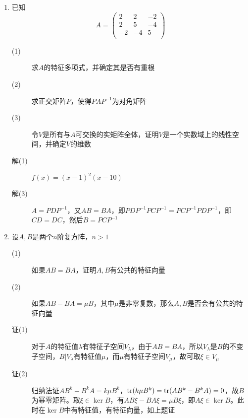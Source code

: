 \begin{enumerate}
\item 已知
\[
A = \left(
\begin{array}{ccc}
2 & 2 & -2 \\
2 & 5 & -4 \\
-2 & -4 & 5 \\
\end{array}\right)
\]
\begin{description}
\item[(1)] 求$A$的特征多项式，并确定其是否有重根
\item[(2)] 求正交矩阵$P$，使得$PAP^{-1}$为对角矩阵
\item[(3)] 令$V$是所有与$A$可交换的实矩阵全体，证明$V$是一个实数域上的线性空间，并确定$V$的维数
\item[解(1)] $f(x)=(x-1)^2(x-10)$
\item[解(3)] $A=PDP^{-1}$，又$AB=BA$，即$PDP^{-1}PCP^{-1}=PCP^{-1}PDP^{-1}$，即$CD=DC$，然后$B=PCP^{-1}$
\end{description}

\item 设$A,B$是两个$n$阶复方阵，$n>1$
\begin{description}
\item[(1)] 如果$AB=BA$，证明$A,B$有公共的特征向量
\item[(2)] 如果$AB-BA=\mu B$，其中$\mu$是非零复数，那么$A,B$是否会有公共的特征向量
\item[证(1)] 对于$A$的特征值$\lambda$有特征子空间$V_{\lambda}$，由于$AB=BA$，所以$V_{\lambda}$是$B$的不变子空间，$B|V_{\lambda}$有特征值$\mu$，而$\mu$有特征子空间$V_{\mu}$，故可取$\xi\in V_{\mu}$
\item[证(2)] 归纳法证$AB^k-B^kA=k\mu B^k$，$\operatorname{tr}(k\mu B^k)=\operatorname{tr}(AB^k-B^kA)=0$，故$B$为幂零矩阵。取$\xi \in \ker B$，有$AB\xi-BA\xi=\mu B\xi$，即$A\xi \in \ker B$。此时在$\ker B$中有特征值，有特征向量，如上题证
\end{description}


\end{enumerate}
